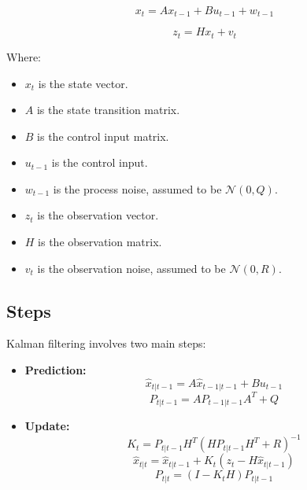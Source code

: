 \documentclass{article}
\begin{document}
\begin{equation}
x_t = A x_{t-1} + B u_{t-1} + w_{t-1}
\end{equation}

\begin{equation}
z_t = H x_t + v_t
\end{equation}

Where:
\begin{itemize}
    \item \( x_t \) is the state vector.
    \item \( A \) is the state transition matrix.
    \item \( B \) is the control input matrix.
    \item \( u_{t-1} \) is the control input.
    \item \( w_{t-1} \) is the process noise, assumed to be \( \mathcal{N}(0, Q) \).
    \item \( z_t \) is the observation vector.
    \item \( H \) is the observation matrix.
    \item \( v_t \) is the observation noise, assumed to be \( \mathcal{N}(0, R) \).
\end{itemize}

\subsection{Steps}
Kalman filtering involves two main steps:
\begin{itemize}
    \item \textbf{Prediction:} 
    \begin{equation}
    \hat{x}_{t|t-1} = A \hat{x}_{t-1|t-1} + B u_{t-1}
    \end{equation}
    \begin{equation}
    P_{t|t-1} = A P_{t-1|t-1} A^T + Q
    \end{equation}
    
    \item \textbf{Update:} 
    \begin{equation}
    K_t = P_{t|t-1} H^T (H P_{t|t-1} H^T + R)^{-1}
    \end{equation}
    \begin{equation}
    \hat{x}_{t|t} = \hat{x}_{t|t-1} + K_t (z_t - H \hat{x}_{t|t-1})
    \end{equation}
    \begin{equation}
    P_{t|t} = (I - K_t H) P_{t|t-1}
    \end{equation}
\end{itemize}
\end{document}
